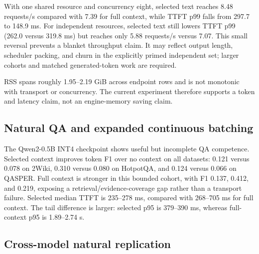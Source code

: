 \documentclass[10pt]{article}
\begin{document}
With one shared resource and concurrency eight, selected text reaches 8.48
requests/s compared with 7.39 for full context, while TTFT p99 falls from
297.7 to 148.9 ms. For independent resources, selected text still lowers TTFT
p99 (262.0 versus 319.8 ms) but reaches only 5.88 requests/s versus 7.07. This
small reversal prevents a blanket throughput claim. It may reflect output
length, scheduler packing, and churn in the explicitly primed independent set;
larger cohorts and matched generated-token work are required.

RSS spans roughly 1.95--2.19 GiB across endpoint rows and is not monotonic with
transport or concurrency. The current experiment therefore supports a token
and latency claim, not an engine-memory saving claim.

\subsection{Natural QA and expanded continuous batching}
\begin{table}[H]
\centering
\scriptsize
\caption{Natural-QA E0 cohort: 20 examples per dataset and two repeats. Times
are milliseconds; retrieval is frozen across the execution conditions.}
\resizebox{\linewidth}{!}{%
}
\label{tab:openvino-natural}
\end{table}

The Qwen2-0.5B INT4 checkpoint shows useful but incomplete QA competence.
Selected context improves token F1 over no context on all datasets: 0.121
versus 0.078 on 2Wiki, 0.310 versus 0.080 on HotpotQA, and 0.124 versus 0.066
on QASPER. Full context is stronger in this bounded cohort, with F1 0.137,
0.412, and 0.219, exposing a retrieval/evidence-coverage gap rather than a
transport failure. Selected median TTFT is 235--278 ms, compared with
268--705 ms for full context. The tail difference is larger: selected p95 is
379--390 ms, whereas full-context p95 is 1.89--2.74 s.

\subsection{Cross-model natural replication}
\begin{table}[H]
\centering
\scriptsize
\caption{Matched natural E0 results across two Qwen sizes and a Llama-family
checkpoint. Each cell aggregates
20 unique examples and two repeats. TTFT is median milliseconds; the ratio is
full divided by selected, so larger favors selected transport.}
\resizebox{\linewidth}{!}{%
}
\label{tab:openvino-cross-model}
\end{table}
\end{document}
